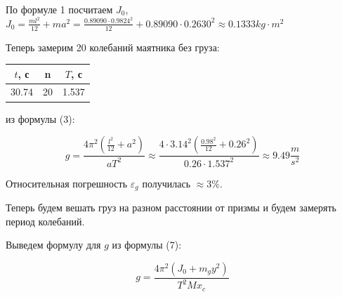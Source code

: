 \documentclass[12pt, a4paper]{article}
\begin{document}
По формуле 1 посчитаем $J_0$, $J_0 = \frac{ml^2}{12} + ma^2 = 
\frac{0.89090 \cdot 0.9824 ^ 2}{12} + 0.89090 \cdot 0.2630^2
\approx 0.1333 kg \cdot m^2$

Теперь замерим 20 колебаний маятника без груза:

\begin{center}
    \begin{tabular}{|c|c|c|}
        \hline

        $t$, с & n & $T$, с \\

        \hline

        30.74 & 20 & 1.537 \\

        \hline
    \end{tabular}
\end{center}

из формулы (3):

\[g = \frac{4\pi^2(\frac{l^2}{12} + a^2)}{aT^2} \approx
\frac{4 \cdot 3.14^2(\frac{0.98^2}{12} + 0.26^2)}{0.26 \cdot 1.537^2}
\approx 9.49 \frac{m}{s^2}\]

Относительная погрешность $\varepsilon_g$ получилась $\approx 3\%$.

Теперь будем вешать груз на разном расстоянии от призмы и будем замерять
период колебаний.

Выведем формулу для $g$ из формулы (7):

\begin{equation}
    g = \frac{4\pi^2(J_0 + m_gy^2)}{T^2Mx_c}
\end{equation}
\end{document}
